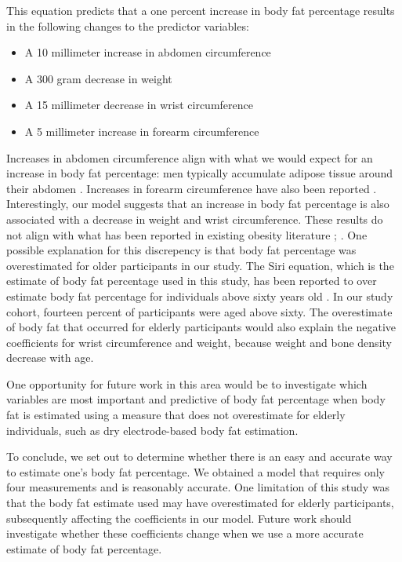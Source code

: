 \documentclass[letterpaper,9pt,twocolumn,twoside,]{pinp}
\providecommand{\tightlist}{%
  \setlength{\itemsep}{0pt}\setlength{\parskip}{0pt}}
\begin{document}
This equation predicts that a one percent increase in body fat
percentage results in the following changes to the predictor variables:

\begin{itemize}
\tightlist
\item
  A 10 millimeter increase in abdomen circumference
\item
  A 300 gram decrease in weight
\item
  A 15 millimeter decrease in wrist circumference
\item
  A 5 millimeter increase in forearm circumference
\end{itemize}

Increases in abdomen circumference align with what we would expect for
an increase in body fat percentage: men typically accumulate adipose
tissue around their abdomen \citep{heitmann1991body}. Increases in
forearm circumference have also been reported
\citep{haffner1993obesity}. Interestingly, our model suggests that an
increase in body fat percentage is also associated with a decrease in
weight and wrist circumference. These results do not align with what has
been reported in existing obesity literature \citep{haffner1993obesity};
\citep{heitmann1991body}. One possible explanation for this discrepency
is that body fat percentage was overestimated for older participants in
our study. The Siri equation, which is the estimate of body fat
percentage used in this study, has been reported to over estimate body
fat percentage for individuals above sixty years old
\citep{guerra2010accuracy}. In our study cohort, fourteen percent of
participants were aged above sixty. The overestimate of body fat that
occurred for elderly participants would also explain the negative
coefficients for wrist circumference and weight, because weight and bone
density decrease with age.

One opportunity for future work in this area would be to investigate
which variables are most important and predictive of body fat percentage
when body fat is estimated using a measure that does not overestimate
for elderly individuals, such as dry electrode-based body fat
estimation.

To conclude, we set out to determine whether there is an easy and
accurate way to estimate one's body fat percentage. We obtained a model
that requires only four measurements and is reasonably accurate. One
limitation of this study was that the body fat estimate used may have
overestimated for elderly participants, subsequently affecting the
coefficients in our model. Future work should investigate whether these
coefficients change when we use a more accurate estimate of body fat
percentage.
\end{document}
